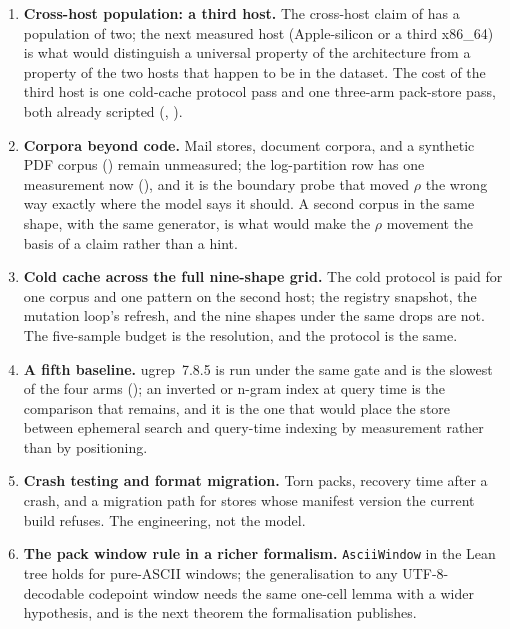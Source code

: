 \documentclass[11pt,letterpaper]{article}
\begin{document}
\begin{enumerate}[leftmargin=*,itemsep=1pt,topsep=2pt]
  measures is the query where one tier's saving is already spent by the
  other. \texttt{both-off} against \texttt{base} is the outer bound and
  is measured; the interior (\texttt{mask-off,ngram-on} and
  \texttt{mask-on,ngram-off} crossed) is the next-higher-order measurement
  the cost model is honest about.
\item \textbf{Cross-host population: a third host.} The cross-host claim
  of  has a population of two; the next measured
  host (Apple-silicon or a third x86\_64) is what would distinguish a
  universal property of the architecture from a property of the two
  hosts that happen to be in the dataset. The cost of the third host is
  one cold-cache protocol pass and one three-arm pack-store pass, both
  already scripted (, ).
\item \textbf{Corpora beyond code.} Mail stores, document corpora, and
  a synthetic PDF corpus () remain
  unmeasured; the log-partition row has one measurement now
  (), and it is the boundary probe that moved $\rho$ the
  wrong way exactly where the model says it should. A second corpus in
  the same shape, with the same generator, is what would make the
  $\rho$ movement the basis of a claim rather than a hint.
\item \textbf{Cold cache across the full nine-shape grid.} The cold
  protocol is paid for one corpus and one pattern on the second host;
  the registry snapshot, the mutation loop's refresh, and the nine
  shapes under the same drops are not. The five-sample budget is the
  resolution, and the protocol is the same.
\item \textbf{A fifth baseline.} ugrep~7.8.5 is run under the same gate
  and is the slowest of the four arms (); an inverted or
  n-gram index at query time is the comparison that remains, and it is
  the one that would place the store between ephemeral search and
  query-time indexing by measurement rather than by positioning.
\item \textbf{Crash testing and format migration.} Torn packs, recovery
  time after a crash, and a migration path for stores whose manifest
  version the current build refuses. The engineering, not the model.
\item \textbf{The pack window rule in a richer formalism.} \texttt{AsciiWindow}
  in the Lean tree holds for pure-ASCII windows; the generalisation to
  any UTF-8-decodable codepoint window needs the same one-cell lemma with
  a wider hypothesis, and is the next theorem the formalisation
  publishes.
\end{enumerate}
\end{document}
